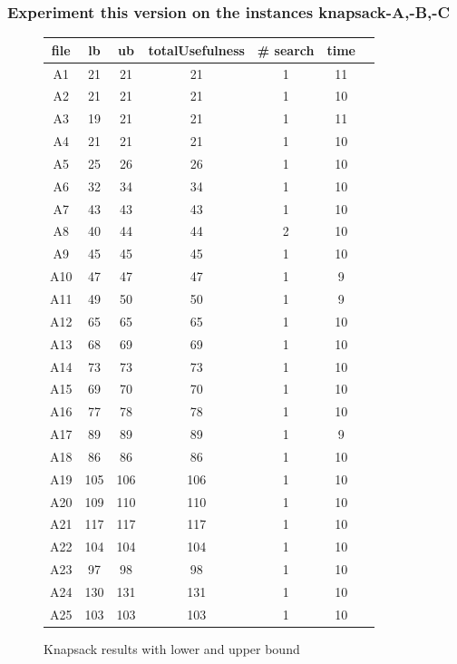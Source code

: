 \documentclass[a4paper ,12pt,french]{article}
\begin{document}
 \subsubsection{Experiment this version on the instances knapsack-A,-B,-C}

\begin{figure}[!h]
\begin{tabular}{|c|c|c|c|c|c|c|}
\hline
file&lb&ub&totalUsefulness&\# search&time\\
\hline
\hline
A1&21&21&21&1&11\\\hline
A2&21&21&21&1&10\\\hline
A3&19&21&21&1&11\\\hline
A4&21&21&21&1&10\\\hline
A5&25&26&26&1&10\\\hline
A6&32&34&34&1&10\\\hline
A7&43&43&43&1&10\\\hline
A8&40&44&44&2&10\\\hline
A9&45&45&45&1&10\\\hline
A10&47&47&47&1&9\\\hline
A11&49&50&50&1&9\\\hline
A12&65&65&65&1&10\\\hline
A13&68&69&69&1&10\\\hline
A14&73&73&73&1&10\\\hline
A15&69&70&70&1&10\\\hline
A16&77&78&78&1&10\\\hline
A17&89&89&89&1&9\\\hline
A18&86&86&86&1&10\\\hline
A19&105&106&106&1&10\\\hline
A20&109&110&110&1&10\\\hline
A21&117&117&117&1&10\\\hline
A22&104&104&104&1&10\\\hline
A23&97&98&98&1&10\\\hline
A24&130&131&131&1&10\\\hline
A25&103&103&103&1&10\\\hline

\end{tabular}
\caption{Knapsack results with lower and upper bound}
\label{LUA}
\end{figure}
\end{document}
